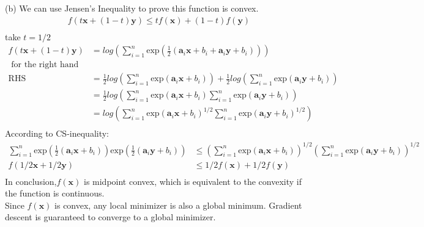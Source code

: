 \documentclass[a4paper,12pt]{article}
\begin{document}
(b)
We can use Jensen's Inequality to prove this function is convex. \\
\begin{align*}
    f(t\bm{x} + (1-t)\bm{y}) \leq tf(\bm{x}) + (1 - t)f(\bm{y}) \\
\end{align*}
     take \(t = 1/2\)  \\
\begin{align*}
    f(t\bm{x} + (1-t)\bm{y}) &= log\left( \sum_{i=1}^{n} \text{exp}(\frac 1 2(\bm{a}_i\bm{x} + b_i + \bm{a}_i\bm{y} + b_i)) \right) \\
    \text{ for the right hand side, we know:} \\
    \text{RHS} &= \frac{1}{2}log(\sum_{i=1}^n\text{exp}(\bm{a}_i\bm{x} + b_i)) + \frac{1}{2}log(\sum_{i=1}^n\text{exp}(\bm{a}_i\bm{y} + b_i)) \\
    &= \frac 1 2 log(\sum_{i=1}^{n}\text{exp}(\bm{a}_i \bm{x} + b_i) \sum_{i=1}^{n}\text{exp}(\bm{a}_i \bm{y} + b_i))\\
    &= log(\sum_{i=1}^{n}\text{exp}(\bm{a}_i \bm{x} + b_i)^{1/2} \sum_{i=1}^{n}\text{exp}(\bm{a}_i \bm{y} + b_i)^{1/2})\\
\end{align*}
According to CS-inequality:
\begin{align*}
    \sum_{i=1}^{n}\text{exp}(\frac{1}{2}(\bm{a}_i\bm{x} + b_i))\text{exp}(\frac{1}{2}(\bm{a}_i\bm{y} + b_i)) &\leq \left( \sum_{i=1}^{n}\text{exp}(\bm{a}_i \bm{x} + b_i) \right)^{1/2}\left( \sum_{i=1}^{n}\text{exp}(\bm{a}_i \bm{y} + b_i) \right)^{1/2} \\ 
    f(1/2\bm{x} + 1/2\bm{y}) &\leq 1/2f(\bm{x}) + 1/2f(\bm{y}) \\
\end{align*}
In conclusion,\(f(\bm{x})\) is midpoint convex, which is equivalent to the convexity if the function is continuous. \\
Since \(f(\bm{x})\) is convex, any local minimizer is also a global minimum. Gradient descent is guaranteed to converge to a global minimizer.
\end{document}

